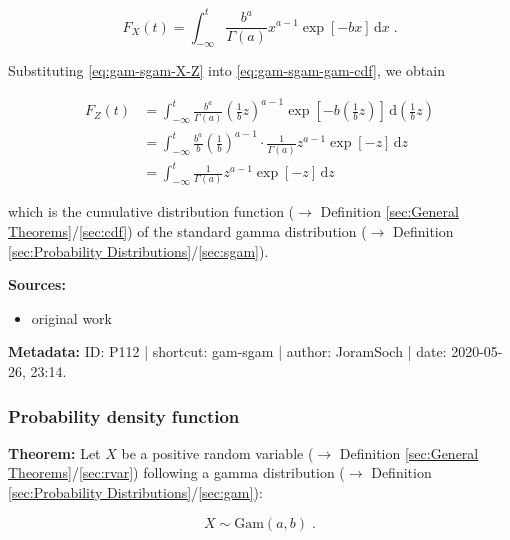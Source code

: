 \documentclass[a4paper,12pt,twoside]{book}
\begin{document}
\begin{equation} \label{eq:gam-sgam-gam-cdf}
F_X(t) = \int_{-\infty}^{t} \frac{b^a}{\Gamma(a)} x^{a-1} \exp[-b x] \, \mathrm{d}x \; .
\end{equation}

Substituting \eqref{eq:gam-sgam-X-Z} into \eqref{eq:gam-sgam-gam-cdf}, we obtain

\begin{equation} \label{eq:gam-sgam-sgam-cdf}
\begin{split}
F_Z(t) &= \int_{-\infty}^{t} \frac{b^a}{\Gamma(a)} \left(\frac{1}{b} z\right)^{a-1} \exp\left[-b \left(\frac{1}{b} z\right)\right] \, \mathrm{d}\left(\frac{1}{b} z\right) \\
&= \int_{-\infty}^{t} \frac{b^a}{b} \left(\frac{1}{b}\right)^{a-1} \cdot \frac{1}{\Gamma(a)} z^{a-1} \exp[-z] \, \mathrm{d}z \\
&= \int_{-\infty}^{t} \frac{1}{\Gamma(a)} z^{a-1} \exp[-z] \, \mathrm{d}z
\end{split}
\end{equation}

which is the cumulative distribution function ($\rightarrow$ Definition \ref{sec:General Theorems}/\ref{sec:cdf}) of the standard gamma distribution ($\rightarrow$ Definition \ref{sec:Probability Distributions}/\ref{sec:sgam}).


\vspace{1em}
\textbf{Sources:}
\begin{itemize}
\item original work\end{itemize}


\vspace{1em}
\textbf{Metadata:} ID: P112 | shortcut: gam-sgam | author: JoramSoch | date: 2020-05-26, 23:14.
\vspace{1em}



\subsubsection[\textbf{Probability density function}]{Probability density function} \label{sec:gam-pdf}
\setcounter{equation}{0}

\textbf{Theorem:} Let $X$ be a positive random variable ($\rightarrow$ Definition \ref{sec:General Theorems}/\ref{sec:rvar}) following a gamma distribution ($\rightarrow$ Definition \ref{sec:Probability Distributions}/\ref{sec:gam}):

\begin{equation} \label{eq:gam-pdf-gam}
X \sim \mathrm{Gam}(a, b) \; .
\end{equation}
\end{document}
